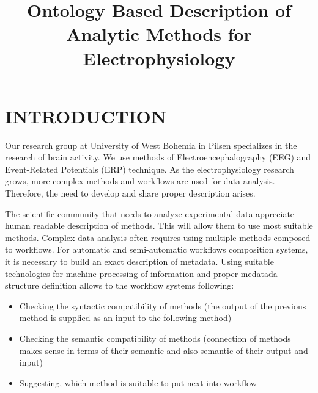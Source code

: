 \documentclass[a4paper,twoside]{article}
\begin{document}
\title{Ontology Based Description of Analytic Methods for Electrophysiology}

\author{
}



\onecolumn \maketitle \normalsize \vfill

\section{\uppercase{Introduction}}
\label{sec:introduction}

\noindent Our research group at University of West Bohemia in Pilsen
specializes in the research of brain activity. We use methods of Electroencephalography (EEG) and Event-Related Potentials (ERP) technique. As the electrophysiology research grows, more complex methods and workflows are used for data analysis. Therefore, the need to develop and share proper description arises.

The scientific community that needs to analyze experimental data appreciate human readable description of methods. This will allow them to use most suitable methods. Complex data analysis often requires using multiple methods composed to workflows. For automatic and semi-automatic workflows composition systems, it is necessary to build an exact description of metadata. Using suitable technologies for machine-processing of information and proper medatada structure definition allows to the workflow systems following:
\begin{itemize}
	\item Checking the syntactic compatibility of methods (the output of the previous method is supplied as an input to the following method)
	
	\item Checking the semantic compatibility of methods (connection of methods makes sense in terms of their semantic and also semantic of their output and input)
	
	\item Suggesting, which method is suitable to put next into workflow
	
\end{itemize}
\end{document}
